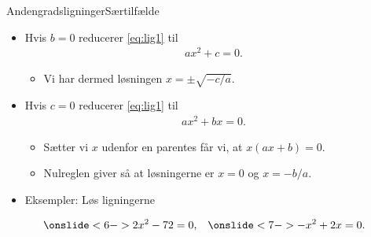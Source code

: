 \begin{frame}{Andengradsligninger}{Særtilfælde}
\begin{itemize}
		\setlength\itemsep{1em}
	\item<1-> Hvis $b=0$ reducerer \eqref{eq:lig1} til
	\begin{align*}
	ax^2+c=0.
	\end{align*}
	\begin{itemize}
		\item<2-> Vi har dermed løsningen $x=\pm \sqrt{-c/a}$.
	\end{itemize}
	\item<3-> Hvis $c=0$ reducerer \eqref{eq:lig1} til
	\begin{align*}
	ax^2+bx=0.
	\end{align*}
	\begin{itemize}
			\setlength\itemsep{1em}
		\item<4-> Sætter vi $x$ udenfor en parentes får vi, at $x(ax+b)=0$.
		\item<5-> Nulreglen giver så at løsningerne er $x=0$ og $x=-b/a$.
	\end{itemize}
	\item<6-> Eksempler: Løs ligningerne

\end{itemize}
	\begin{align*}
\onslide<6->{2x^2-72=0,}&& \onslide<7->{-x^2+2x=0.}
\end{align*}
\end{frame}

